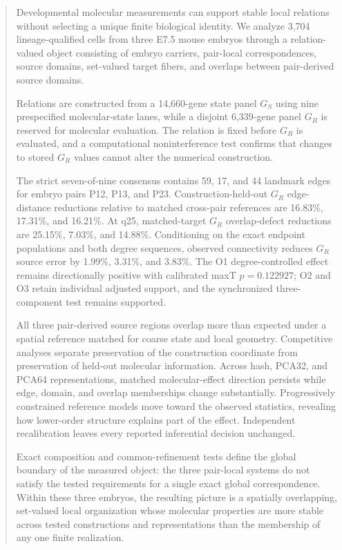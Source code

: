 \documentclass[11pt]{article}
\begin{document}
\begin{abstract}
Developmental molecular measurements can support stable local relations without selecting a unique finite biological identity. We analyze 3,704 lineage-qualified cells from three E7.5 mouse embryos through a relation-valued object consisting of embryo carriers, pair-local correspondences, source domains, set-valued target fibers, and overlaps between pair-derived source domains.

Relations are constructed from a 14,660-gene state panel \(G_S\) using nine prespecified molecular-state lanes, while a disjoint 6,339-gene panel \(G_R\) is reserved for molecular evaluation. The relation is fixed before \(G_R\) is evaluated, and a computational noninterference test confirms that changes to stored \(G_R\) values cannot alter the numerical construction.

The strict seven-of-nine consensus contains 59, 17, and 44 landmark edges for embryo pairs P12, P13, and P23. Construction-held-out \(G_R\) edge-distance reductions relative to matched cross-pair references are 16.83\%, 17.31\%, and 16.21\%. At q25, matched-target \(G_R\) overlap-defect reductions are 25.15\%, 7.03\%, and 14.88\%. Conditioning on the exact endpoint populations and both degree sequences, observed connectivity reduces \(G_R\) source error by 1.99\%, 3.31\%, and 3.83\%. The O1 degree-controlled effect remains directionally positive with calibrated maxT \(p=0.122927\); O2 and O3 retain individual adjusted support, and the synchronized three-component test remains supported.

All three pair-derived source regions overlap more than expected under a spatial reference matched for coarse state and local geometry. Competitive analyses separate preservation of the construction coordinate from preservation of held-out molecular information. Across hash, PCA32, and PCA64 representations, matched molecular-effect direction persists while edge, domain, and overlap memberships change substantially. Progressively constrained reference models move toward the observed statistics, revealing how lower-order structure explains part of the effect. Independent recalibration leaves every reported inferential decision unchanged.

Exact composition and common-refinement tests define the global boundary of the measured object: the three pair-local systems do not satisfy the tested requirements for a single exact global correspondence. Within these three embryos, the resulting picture is a spatially overlapping, set-valued local organization whose molecular properties are more stable across tested constructions and representations than the membership of any one finite realization.
\end{abstract}
\newpage
\end{document}
